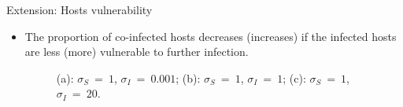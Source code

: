 \documentclass{beamer}
\begin{document}
	\begin{frame}{Extension: Hosts vulnerability}
		\begin{itemize}
			\item The proportion of co-infected hosts decreases (increases) if the infected hosts are less (more) vulnerable to further infection.
			\vspace{1em}
			\begin{figure}[htbp]
				\label{Figure 9}
				\centering
				\caption{(a): $\sigma_S\ =\ 1$, $\sigma_I\ =\ 0.001$; (b): $\sigma_S\ =\ 1$, $\sigma_I\ =\ 1$; (c): $\sigma_S\ =\ 1$, $\sigma_I\ =\ 20$.}
			\end{figure}
		\end{itemize}
	\end{frame}
\end{document}
